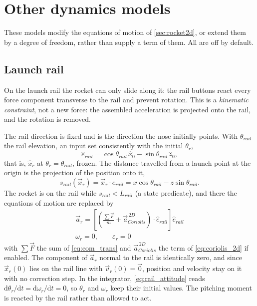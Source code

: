 \section{Other dynamics models}\label{sec:other_dynamics}
These models modify the equations of motion of \autoref{sec:rocket2d}, or extend them by a degree
of freedom, rather than supply a term of them. All are off by default.

\subsection{Launch rail}\label{sec:rail}
On the launch rail the rocket can only slide along it: the rail buttons react every force component
transverse to the rail and prevent rotation. This is a \emph{kinematic constraint}, not a new
force: the assembled acceleration is projected onto the rail, and the rotation is removed.

The rail direction is fixed and is the direction the nose initially points. With $\theta_{rail}$
the rail elevation, an input set consistently with the initial $\theta_r$,
\begin{equation} \label{eq:rail_direction}
    \hat{e}_{rail} = \cos\theta_{rail}\,\hat{x}_0 - \sin\theta_{rail}\,\hat{z}_0,
\end{equation}
that is, $\hat{x}_r$ at $\theta_r=\theta_{rail}$, frozen. The distance travelled from a launch
point at the origin is the projection of the position onto it,
\begin{equation} \label{eq:rail_distance}
    s_{rail}(\vec{x}_r) = \vec{x}_r\cdot\hat{e}_{rail}
        = x\cos\theta_{rail}-z\sin\theta_{rail}.
\end{equation}
The rocket is on the rail while $s_{rail}<L_{rail}$ (a state predicate), and there the equations
of motion are replaced by
\begin{gather}
    \vec{a}_r = \left[\left(\frac{\sum\vec{F}}{m}
        + \vec{a}_{Coriolis}^{\,2D}\right)\cdot\hat{e}_{rail}\right]\hat{e}_{rail}
        \label{eq:rail_constraint} \\
    \omega_r = 0, \qquad \varepsilon_r = 0 \label{eq:rail_attitude}
\end{gather}
with $\sum\vec{F}$ the sum of \autoref{eq:eom_trans} and $\vec{a}_{Coriolis}^{\,2D}$ the term of
\autoref{eq:coriolis_2d} if enabled. The component of $\vec{a}_r$ normal to the rail is identically
zero, and since $\vec{x}_r(0)$ lies on the rail line with $\vec{v}_r(0)=\vec{0}$, position and
velocity stay on it with no correction step. In the integrator, \autoref{eq:rail_attitude} reads
$\mathrm{d}\theta_r/\mathrm{d}t=\mathrm{d}\omega_r/\mathrm{d}t=0$, so $\theta_r$ and $\omega_r$ keep
their initial values. The pitching moment is reacted by the rail rather than allowed to act.

